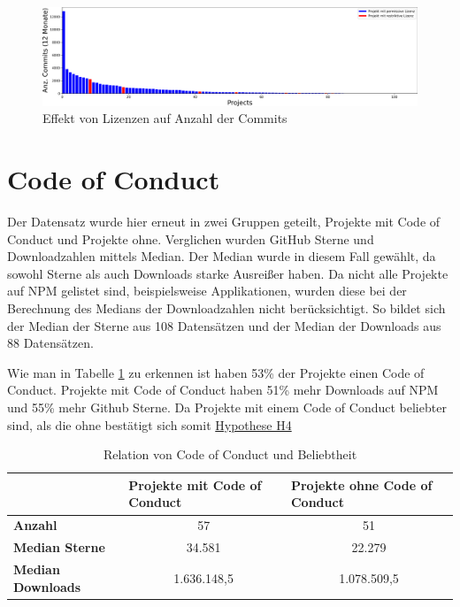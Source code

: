 \begin{figure}[]
    \centering
    \includegraphics[scale=0.4]{figures/05/license_vs_last12MonthsCommits_asBarChart.png}
    \caption{Effekt von Lizenzen auf Anzahl der Commits}
    \label{abb:license_vs_commits}
\end{figure}



\newpage %
\section{Code of Conduct}\label{sec:CoC}
Der Datensatz wurde hier erneut in zwei Gruppen geteilt, Projekte mit Code of Conduct und Projekte
ohne. Verglichen wurden GitHub Sterne und Downloadzahlen mittels Median. Der Median wurde in diesem
Fall gewählt, da sowohl Sterne als auch Downloads starke Ausreißer haben. Da nicht alle Projekte auf
NPM gelistet sind, beispielsweise Applikationen, wurden diese bei der Berechnung des Medians der
Downloadzahlen nicht berücksichtigt. So bildet sich der Median der Sterne aus 108  Datensätzen
und der Median der Downloads aus 88 Datensätzen.

Wie man in Tabelle \ref{tab:relation_CoC_Popularity} zu erkennen ist haben 53\% der Projekte einen
Code of Conduct.
Projekte mit Code of Conduct haben 51\% mehr Downloads auf NPM und 55\% mehr Github Sterne.
Da Projekte mit einem Code of Conduct beliebter sind, als die ohne bestätigt sich somit
\hyperref[H:4]{Hypothese H4}


\begin{table}[h]
    \begin{tabular}{l|c|c|}
        \cline{2-3}
                                  & \multicolumn{1}{l|}{\textbf{Projekte mit Code of Conduct}} & \multicolumn{1}{l|}{\textbf{Projekte ohne Code of Conduct}} \\ \hline
        \textbf{Anzahl}           & 57                                                         & 51                                                          \\ \hline
        \textbf{Median Sterne}    & 34.581                                                     & 22.279                                                      \\ \hline
        \textbf{Median Downloads} & 1.636.148,5                                                & 1.078.509,5                                                 \\ \cline{2-3}
    \end{tabular}%
    \caption{Relation von Code of Conduct und Beliebtheit}
    \label{tab:relation_CoC_Popularity}
\end{table}


